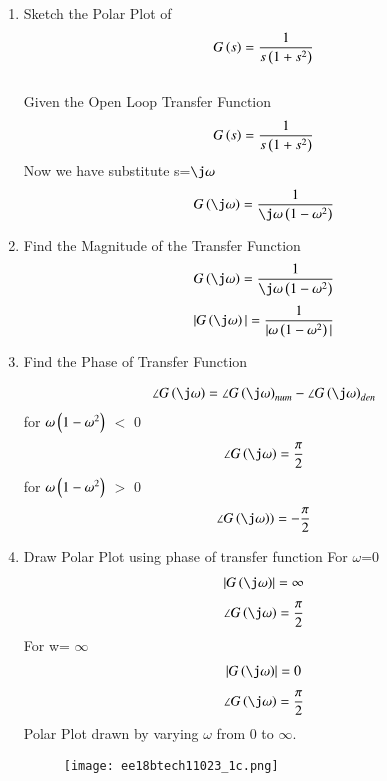 \begin{enumerate}[label=\thesection.\arabic*.,ref=\thesection.\theenumi]
\item
Sketch the Polar Plot of
\begin{align}
G\left(s\right) = \frac{1}{s\left(1+s^{2}\right)}
\end{align}
\\
\solution  
Given the Open Loop Transfer Function
\begin{align}
G\left(s\right) = \frac{1}{s\left(1+s^{2}\right)}
\end{align}
Now we have substitute s=$\j\omega$
\begin{align}
G\brak{\j\omega} =   \frac{1}{\j\omega\brak{1-{\omega}^{2}}}
\end{align}

\item
Find the Magnitude of the Transfer Function
\begin{align}
G\brak{\j\omega} =   \frac{1}{\j\omega\brak{1-{\omega}^{2}}}
\end{align}
\begin{align}
      |G\brak{\j\omega}| = \frac{1}{|\omega\brak{1-{\omega}^{2}}|}
\end{align}
\item
Find the Phase of Transfer Function

\begin{align}
    \angle G\brak{\j\omega} = \angle G\brak{\j\omega}_{num} - \angle G\brak{\j\omega}_{den}
\end{align}
for $\omega\left(1-{\omega}^{2}\right)$ $<$ 0
\begin{align}
    \angle G\brak{\j\omega} = \frac{\pi}{2}
\end{align}
for $\omega\left(1-{\omega}^{2}\right)$ $>$ 0
\begin{align}
    \angle G\brak{\j\omega}) = -\frac{\pi}{2}
\end{align}
\item
Draw Polar Plot using phase of transfer function
For $\omega$=0 
\begin{align}
    \abs{G\brak{\j\omega}} = \infty
    \end{align}
\begin{align}
    \angle G\brak{\j\omega} = \frac{\pi}{2}
\end{align}
For w= $\infty$
\begin{align}
    \abs{G\brak{\j\omega}} = 0
    \end{align}
\begin{align}
    \angle G\brak{\j\omega} = \frac{\pi}{2}
\end{align}
Polar Plot drawn by varying $\omega$ from 0 to $\infty$.
\begin{figure}[!h]
  \texttt{[image: ee18btech11023\_1c.png]}
  \caption{}
  \label{ee18btech11023}
\end{figure}


\end{enumerate}
